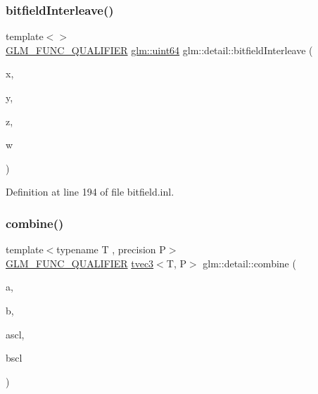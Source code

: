 \subsubsection{\texorpdfstring{bitfieldInterleave()}{bitfieldInterleave()}\hspace{0.1cm}{\footnotesize\ttfamily [11/11]}}
{\footnotesize\ttfamily template$<$$>$ \\
\mbox{\hyperlink{setup_8hpp_a33fdea6f91c5f834105f7415e2a64407}{G\+L\+M\+\_\+\+F\+U\+N\+C\+\_\+\+Q\+U\+A\+L\+I\+F\+I\+ER}} \mbox{\hyperlink{group__gtc__type__precision_gae3632bf9b37da66233d78930dd06378a}{glm\+::uint64}} glm\+::detail\+::bitfield\+Interleave (\begin{DoxyParamCaption}\item[{\mbox{\hyperlink{group__gtc__type__precision_gad8c2939e1fdd8e5828b31d95c52255d5}{glm\+::uint16}}}]{x,  }\item[{\mbox{\hyperlink{group__gtc__type__precision_gad8c2939e1fdd8e5828b31d95c52255d5}{glm\+::uint16}}}]{y,  }\item[{\mbox{\hyperlink{group__gtc__type__precision_gad8c2939e1fdd8e5828b31d95c52255d5}{glm\+::uint16}}}]{z,  }\item[{\mbox{\hyperlink{group__gtc__type__precision_gad8c2939e1fdd8e5828b31d95c52255d5}{glm\+::uint16}}}]{w }\end{DoxyParamCaption})}



Definition at line 194 of file bitfield.\+inl.

\mbox{\label{namespaceglm_1_1detail_ae1c6c18912ed1a03fc850bb11755213c}} 
\subsubsection{\texorpdfstring{combine()}{combine()}}
{\footnotesize\ttfamily template$<$typename T , precision P$>$ \\
\mbox{\hyperlink{setup_8hpp_a33fdea6f91c5f834105f7415e2a64407}{G\+L\+M\+\_\+\+F\+U\+N\+C\+\_\+\+Q\+U\+A\+L\+I\+F\+I\+ER}} \mbox{\hyperlink{structglm_1_1tvec3}{tvec3}}$<$T, P$>$ glm\+::detail\+::combine (\begin{DoxyParamCaption}\item[{\mbox{\hyperlink{structglm_1_1tvec3}{tvec3}}$<$ T, P $>$ const \&}]{a,  }\item[{\mbox{\hyperlink{structglm_1_1tvec3}{tvec3}}$<$ T, P $>$ const \&}]{b,  }\item[{T}]{ascl,  }\item[{T}]{bscl }\end{DoxyParamCaption})}



